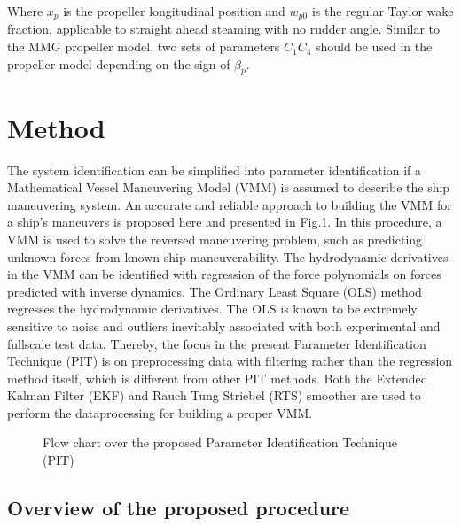 \documentclass[review]{elsarticle}
\let\sphinxpxdimen\pdfpxdimen\else\newdimen\sphinxpxdimen
\begin{document}
Where \(x_p\) is the propeller longitudinal position and \(w_{p0}\) is the regular Taylor wake fraction, applicable to straight ahead steaming with no rudder angle. Similar to the MMG propeller model, two sets of parameters \(C_1\)\sphinxhyphen{}\(C_4\) should be used in the propeller model depending on the sign of \(\beta_p\).


\section{Method}
\label{\detokenize{01.01_method:method}}\label{\detokenize{01.01_method:id1}}\label{\detokenize{01.01_method::doc}}
  
The system identification can be simplified into parameter identification if a Mathematical Vessel Maneuvering Model (VMM) is assumed to describe the ship maneuvering system. An accurate and reliable approach to building the VMM for a ship’s maneuvers is proposed here and presented in \hyperref[\detokenize{01.01_method:overview}]{Fig.\@ \ref{\detokenize{01.01_method:overview}}}.
In this procedure, a VMM is used to solve the reversed maneuvering problem, such as predicting unknown forces from known ship maneuverability. The hydrodynamic derivatives in the VMM can be identified with regression of the force polynomials on forces predicted with inverse dynamics. The Ordinary Least Square (OLS) method regresses the hydrodynamic derivatives. The OLS is known to be extremely sensitive to noise and outliers inevitably associated with both experimental and full\sphinxhyphen{}scale test data. Thereby, the focus in the present Parameter Identification Technique (PIT) is on pre\sphinxhyphen{}processing data with filtering rather than the regression method itself, which is different from other PIT methods. Both the Extended Kalman Filter (EKF) and Rauch Tung Striebel (RTS) smoother are used to perform the data\sphinxhyphen{}processing for building a proper VMM.

\begin{figure}[H]
\centering
\capstart

\noindent\sphinxincludegraphics[width=500\sphinxpxdimen]{{method}.png}
\caption{Flow chart over the proposed Parameter Identification Technique (PIT)}\label{\detokenize{01.01_method:overview}}\end{figure}


\subsection{Overview of the proposed procedure}
\label{\detokenize{01.01_method:overview-of-the-proposed-procedure}}
  
\end{document}
